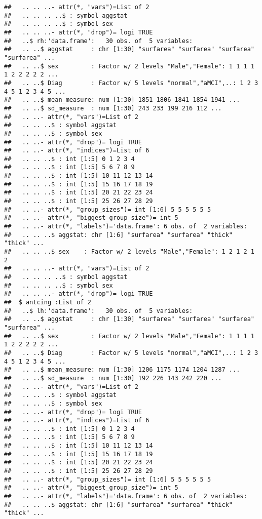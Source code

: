 \documentclass[12pt]{article}\usepackage[]{graphicx}\usepackage[]{color}
\makeatletter
\newenvironment{kframe}{%
 \def\at@end@of@kframe{}%
 \ifinner\ifhmode%
  \def\at@end@of@kframe{\end{minipage}}%
  \begin{minipage}{\columnwidth}%
 \fi\fi%
 \def\FrameCommand##1{\hskip\@totalleftmargin \hskip-\fboxsep
 \colorbox{shadecolor}{##1}\hskip-\fboxsep
     \hskip-\linewidth \hskip-\@totalleftmargin \hskip\columnwidth}%
 \MakeFramed {\advance\hsize-\width
   \@totalleftmargin\z@ \linewidth\hsize
   \@setminipage}}%
 {\par\unskip\endMakeFramed%
 \at@end@of@kframe}
\newenvironment{knitrout}{}{} %
\makeatother
\begin{document}
\begin{knitrout}
\begin{kframe}
\begin{verbatim}
##   .. .. ..- attr(*, "vars")=List of 2
##   .. .. .. ..$ : symbol aggstat
##   .. .. .. ..$ : symbol sex
##   .. .. ..- attr(*, "drop")= logi TRUE
##   ..$ rh:'data.frame':	30 obs. of  5 variables:
##   .. ..$ aggstat     : chr [1:30] "surfarea" "surfarea" "surfarea" "surfarea" ...
##   .. ..$ sex         : Factor w/ 2 levels "Male","Female": 1 1 1 1 1 2 2 2 2 2 ...
##   .. ..$ Diag        : Factor w/ 5 levels "normal","aMCI",..: 1 2 3 4 5 1 2 3 4 5 ...
##   .. ..$ mean_measure: num [1:30] 1851 1806 1841 1854 1941 ...
##   .. ..$ sd_measure  : num [1:30] 243 233 199 216 112 ...
##   .. ..- attr(*, "vars")=List of 2
##   .. .. ..$ : symbol aggstat
##   .. .. ..$ : symbol sex
##   .. ..- attr(*, "drop")= logi TRUE
##   .. ..- attr(*, "indices")=List of 6
##   .. .. ..$ : int [1:5] 0 1 2 3 4
##   .. .. ..$ : int [1:5] 5 6 7 8 9
##   .. .. ..$ : int [1:5] 10 11 12 13 14
##   .. .. ..$ : int [1:5] 15 16 17 18 19
##   .. .. ..$ : int [1:5] 20 21 22 23 24
##   .. .. ..$ : int [1:5] 25 26 27 28 29
##   .. ..- attr(*, "group_sizes")= int [1:6] 5 5 5 5 5 5
##   .. ..- attr(*, "biggest_group_size")= int 5
##   .. ..- attr(*, "labels")='data.frame':	6 obs. of  2 variables:
##   .. .. ..$ aggstat: chr [1:6] "surfarea" "surfarea" "thick" "thick" ...
##   .. .. ..$ sex    : Factor w/ 2 levels "Male","Female": 1 2 1 2 1 2
##   .. .. ..- attr(*, "vars")=List of 2
##   .. .. .. ..$ : symbol aggstat
##   .. .. .. ..$ : symbol sex
##   .. .. ..- attr(*, "drop")= logi TRUE
##  $ antcing :List of 2
##   ..$ lh:'data.frame':	30 obs. of  5 variables:
##   .. ..$ aggstat     : chr [1:30] "surfarea" "surfarea" "surfarea" "surfarea" ...
##   .. ..$ sex         : Factor w/ 2 levels "Male","Female": 1 1 1 1 1 2 2 2 2 2 ...
##   .. ..$ Diag        : Factor w/ 5 levels "normal","aMCI",..: 1 2 3 4 5 1 2 3 4 5 ...
##   .. ..$ mean_measure: num [1:30] 1206 1175 1174 1204 1287 ...
##   .. ..$ sd_measure  : num [1:30] 192 226 143 242 220 ...
##   .. ..- attr(*, "vars")=List of 2
##   .. .. ..$ : symbol aggstat
##   .. .. ..$ : symbol sex
##   .. ..- attr(*, "drop")= logi TRUE
##   .. ..- attr(*, "indices")=List of 6
##   .. .. ..$ : int [1:5] 0 1 2 3 4
##   .. .. ..$ : int [1:5] 5 6 7 8 9
##   .. .. ..$ : int [1:5] 10 11 12 13 14
##   .. .. ..$ : int [1:5] 15 16 17 18 19
##   .. .. ..$ : int [1:5] 20 21 22 23 24
##   .. .. ..$ : int [1:5] 25 26 27 28 29
##   .. ..- attr(*, "group_sizes")= int [1:6] 5 5 5 5 5 5
##   .. ..- attr(*, "biggest_group_size")= int 5
##   .. ..- attr(*, "labels")='data.frame':	6 obs. of  2 variables:
##   .. .. ..$ aggstat: chr [1:6] "surfarea" "surfarea" "thick" "thick" ...

\end{verbatim}
\end{kframe}
\end{knitrout}
\end{document}
